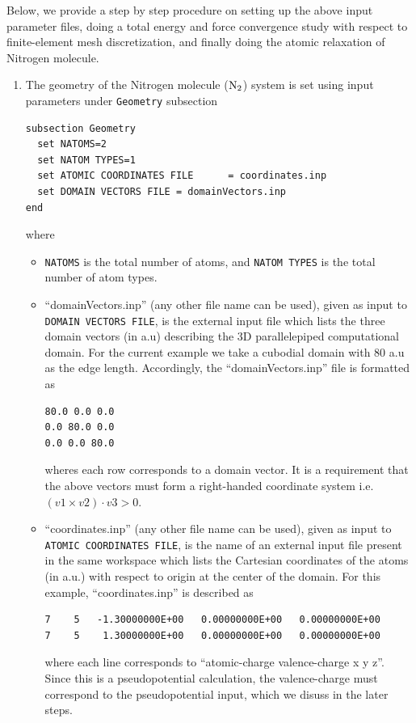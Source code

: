 Below, we provide a step by step procedure on setting up the above input parameter files, doing a total energy and force convergence study with respect to finite-element mesh discretization, and finally doing the atomic relaxation of Nitrogen molecule.
\begin{enumerate}
\item The geometry of the Nitrogen molecule (${\rm N}_{2}$) system is set using input parameters under \verb|Geometry| subsection
\begin{verbatim}
subsection Geometry
  set NATOMS=2
  set NATOM TYPES=1
  set ATOMIC COORDINATES FILE      = coordinates.inp 
  set DOMAIN VECTORS FILE = domainVectors.inp
end
\end{verbatim}
where
\begin{itemize}		

\item \verb|NATOMS| is the total number of atoms, and \verb|NATOM TYPES| is the total number of atom types.
	
\item``domainVectors.inp'' (any other file name can be used), given as input to \verb|DOMAIN VECTORS FILE|,  is the external input file which lists the three domain vectors (in a.u) describing the
3D parallelepiped computational domain. For the current example we take a cubodial domain with 80 a.u as the edge length. 
Accordingly, the ``domainVectors.inp'' file is formatted as  
\begin{verbatim}
80.0 0.0 0.0
0.0 80.0 0.0
0.0 0.0 80.0
\end{verbatim}
wheres each row corresponds to a domain vector.
It is a requirement that the above vectors must form a right-handed coordinate system i.e. $(v1 \times v2)\cdot v3 >0$.

\item ``coordinates.inp'' (any other file name can be used), given as input to \verb|ATOMIC COORDINATES FILE|, is the name of an external input file present in the same workspace which lists the Cartesian coordinates of the atoms (in a.u.) with respect to origin at the center of the domain. For this example, ``coordinates.inp'' is described as 
\begin{verbatim}
7    5   -1.30000000E+00   0.00000000E+00   0.00000000E+00
7    5    1.30000000E+00   0.00000000E+00   0.00000000E+00
\end{verbatim}
where each line corresponds to ``atomic-charge valence-charge x y z''. Since this is a pseudopotential calculation, the valence-charge must correspond to the pseudopotential input, which we disuss in the later steps.


\end{itemize}
\end{enumerate}
